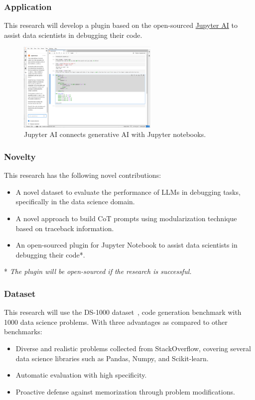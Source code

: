 \documentclass{beamer}
\newcounter{cont}
\begin{document}
\begin{frame}[allowframebreaks]
\frametitle{Application}
This research will develop a plugin based on the open-sourced \href{https://github.com/jupyterlab/jupyter-ai?tab=readme-ov-file}{Jupyter AI} to assist data scientists in debugging their code.
  \begin{figure}
    \centering
    \includegraphics[width=0.6\textwidth]{img/jupyter_ai_screenshot.png}
    \caption{Jupyter AI connects generative AI with Jupyter notebooks.}
  \end{figure}
\end{frame}

\begin{frame}[allowframebreaks]
\frametitle{Novelty}
This research has the following novel contributions:
  \begin{itemize}
    \item A novel dataset to evaluate the performance of LLMs in debugging tasks, specifically in the data science domain.
    \item A novel approach to build CoT prompts using modularization technique based on traceback information.
    \item An open-sourced plugin for Jupyter Notebook to assist data scientists in debugging their code*.
  \end{itemize}
  * \textit{The plugin will be open-sourced if the research is successful.}
\end{frame}

\begin{frame}[allowframebreaks]
\frametitle{Dataset}
This research will use the DS-1000 dataset~\cite{Lai2022DS1000}, code generation benchmark with 1000 data science problems. With three advantages as compared to other benchmarks:
  \begin{itemize}
    \item Diverse and realistic problems collected from StackOverflow, covering several data science libraries such as Pandas, Numpy, and Scikit-learn.
    \item Automatic evaluation with high specificity.
    \item Proactive defense against memorization through problem modifications.
  \end{itemize}
\end{frame}
\end{document}
